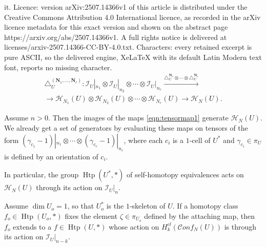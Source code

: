 \documentclass[10pt,a4paper]{amsart}
\def\Hcal{{\mathcal H}}
\def\Ical{{\mathcal I}}
\def\Nbold{{\mathbf N}}
\def\g{\gamma}
\def\tri{\triangle}
\newcommand\Htp{\operatorname{Htp}}
\newcommand\conf{\mathscr{C}\!\mathit{onf}\!}
\begin{document}
it. Licence: version arXiv:2507.14366v1 of this article is distributed under the Creative Commons Attribution 4.0 International licence, as recorded in the arXiv licence metadata for this exact version and shown on the abstract page https://arxiv.org/abs/2507.14366v1. A full rights notice is delivered at licenses/arxiv-2507.14366-CC-BY-4.0.txt. Characters: every retained excerpt is pure ASCII, so the delivered engine, XeLaTeX with its default Latin Modern text font, reports no missing character.
\begin{multline}\label{eqn:tensormap1}
\tri_U^{(\Nbold_1, \dots,\Nbold_r)}: \Ical_{U}|_{n_1}\otimes\Ical_{U}|_{n_2}\otimes\cdots\otimes \Ical_{U}|_{n_r}
\xrightarrow{\triangle_U^{\Nbold_1}\otimes\cdots\otimes \triangle_U^{\Nbold_r}}\\
\to \Hcal_{N_1}(U)\otimes\Hcal_{N_2}(U)\otimes\cdots \otimes\Hcal_{N_r}(U)\to \Hcal_N(U).
\end{multline}

\begin{theorem}\label{thm:generation}
Assume $n>0$. Then the images of the  maps \eqref{eqn:tensormap1} generate $\Hcal_N(U)$. We  already get a set of generators by evaluating these maps on  tensors of the form $(\g_{c_1}-1)|_{n_1}\otimes\cdots\otimes (\g_{c_r}-1)|_{n_r}$, where each $c_i$ is a $1$-cell of $U^*$ and $\g_{c_i}\in \pi_U$ is defined by an orientation of $c_i$.

In particular,  the group $\Htp(U^*,*)$ of self-homotopy equivalences acts on $\Hcal_N(U)$  through its action on $\Ical_{U}|_n$.
\end{theorem} 

\begin{corollary}\label{cor:zeta-generation}
Assume $\dim U_o=1$,  so that $U_o^*$ is the  $1$-skeleton of $U$. If  a homotopy class $f_o\in \Htp(U_o,*)$ fixes the element  $\zeta\in \pi_{U_o}$ defined by the attaching map,  then $f_o$ extends to a  $f\in \Htp(U,*)$ whose action on  $H^{cl}_k(\conf_N(U))$ is  through its action  on $\Ical_{U}|_{n-k}$.
\end{corollary}
\end{document}
